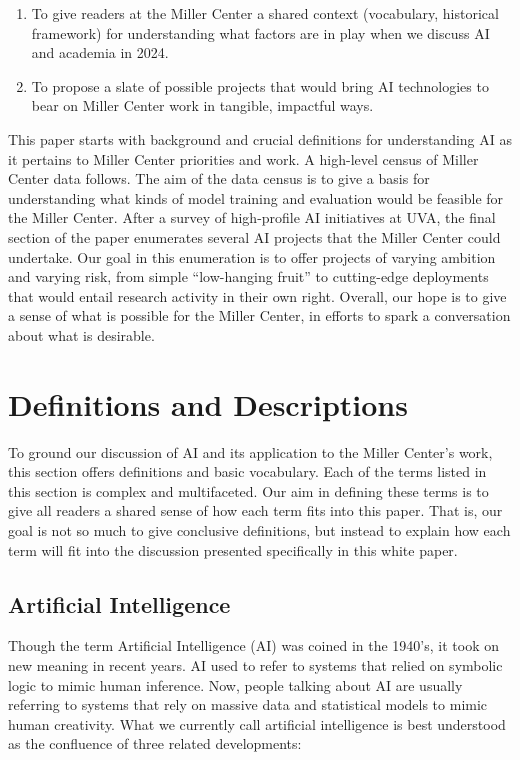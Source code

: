 \documentclass[12pt, oneside]{article}   	%
\begin{document}
\begin{enumerate}
\item To give readers at the Miller Center a shared context (vocabulary, historical framework) for understanding what factors are in play when we discuss AI and academia in 2024.
\pagebreak
\item To propose a slate of possible projects that would bring AI technologies to bear on Miller Center work in tangible, impactful ways.
\end{enumerate}

This paper starts with background and crucial definitions for understanding AI as it pertains to Miller Center priorities and work.  A high-level census of Miller Center data follows.  The aim of the data census is to give a basis for understanding what kinds of model training and evaluation would be feasible for the Miller Center.  After a survey of high-profile AI initiatives at UVA, the final section of the paper enumerates several AI projects that the Miller Center could undertake.  Our goal in this enumeration is to offer projects of varying ambition and varying risk, from simple ``low-hanging fruit'' to cutting-edge deployments that would entail research activity in their own right.  Overall, our hope is to give a sense of what is possible for the Miller Center, in efforts to spark a conversation about what is desirable.


\section{Definitions and Descriptions}\label{section.definitions}
To ground our discussion of AI and its application to the Miller Center's work, this section offers definitions and basic vocabulary.  Each of the terms listed in this section is complex and multifaceted.  Our aim in defining these terms is to give all readers a shared sense of how each term fits into this paper.  That is, our goal is not so much to give conclusive definitions, but instead to explain how each term will fit into the discussion presented specifically in this white paper.


\subsection{Artificial Intelligence}\label{section.definitions.artificial-intelligence}
Though the term Artificial Intelligence (AI) was coined in the 1940’s, it took on new meaning in recent years.  AI used to refer to systems that relied on symbolic logic to mimic human inference.  Now, people talking about AI are usually referring to systems that rely on massive data and statistical models to mimic human creativity.  What we currently call artificial intelligence is best understood as the confluence of three related developments:
\end{document}
